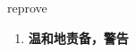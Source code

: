 
\begin{frame}
{\huge reprove}
\begin{center}
\begin{enumerate}\Large
  \item \textbf{温和地责备，警告}
\end{enumerate}
\end{center}
\end{frame}

